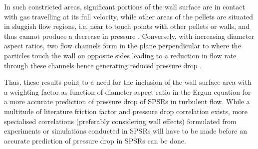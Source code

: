 In such constricted areas, significant portions of the wall surface are in contact with gas travelling at its full velocity, while other areas of the pellets are situated in sluggish flow regions, i.e. near to touch points with other pellets or walls, and thus cannot produce a decrease in pressure \cite{Fernengel2020}. Conversely, with increasing diameter aspect ratios, two flow channels form in the plane perpendicular to where the particles touch the wall on opposite sides leading to a reduction in flow rate through these channels hence generating reduced pressure drop \cite{Fernengel2020}.

Thus, these results point to a need for the inclusion of the wall surface area with a weighting factor as function of diameter aspect ratio in the Ergun equation for a more accurate prediction of pressure drop of SPSRs in turbulent flow. While a multitude of literature friction factor and pressure drop correlation exists, more specialised correlations (preferably considering wall effects) formulated from experiments or simulations conducted in SPSRs will have to be made before an accurate prediction of pressure drop in SPSRs can be done.

%



